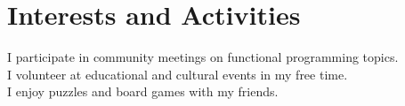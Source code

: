 \section{Interests and Activities}

I participate in community meetings on functional programming topics. \\
I volunteer at educational and cultural events in my free time. \\
I enjoy puzzles and board games with my friends. 